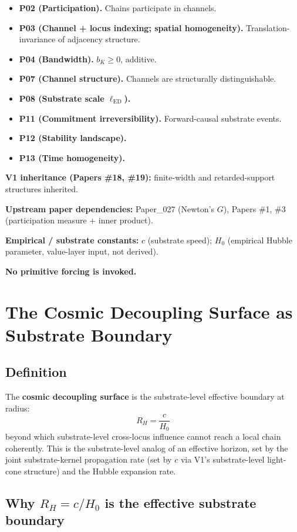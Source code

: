 \documentclass[11pt,a4paper]{article}
\begin{document}
\begin{itemize}[noitemsep]
\item \textbf{P02 (Participation).} Chains participate in channels.
\item \textbf{P03 (Channel + locus indexing; spatial homogeneity).} Translation-invariance of adjacency structure.
\item \textbf{P04 (Bandwidth).} $b_K \geq 0$, additive.
\item \textbf{P07 (Channel structure).} Channels are structurally distinguishable.
\item \textbf{P08 (Substrate scale $\ell_\mathrm{ED}$).}
\item \textbf{P11 (Commitment irreversibility).} Forward-causal substrate events.
\item \textbf{P12 (Stability landscape).}
\item \textbf{P13 (Time homogeneity).}
\end{itemize}

\textbf{V1 inheritance (Papers \#18, \#19):} finite-width and retarded-support structures inherited.

\textbf{Upstream paper dependencies:} Paper\_027 (Newton's $G$), Papers \#1, \#3 (participation measure + inner product).

\textbf{Empirical / substrate constants:} $c$ (substrate speed); $H_0$ (empirical Hubble parameter, value-layer input, not derived).

\textbf{No primitive forcing is invoked.}

\section{The Cosmic Decoupling Surface as Substrate Boundary}

\subsection{Definition}

The \textbf{cosmic decoupling surface} is the substrate-level effective boundary at radius:
\[
R_H = \frac{c}{H_0}
\]
beyond which substrate-level cross-locus influence cannot reach a local chain coherently. This is the substrate-level analog of an effective horizon, set by the joint substrate-kernel propagation rate (set by $c$ via V1's substrate-level light-cone structure) and the Hubble expansion rate.

\subsection{Why $R_H = c/H_0$ is the effective substrate boundary}
\end{document}

